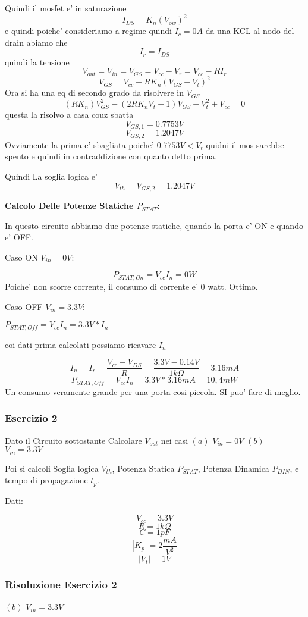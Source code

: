 \documentclass[\main/main.tex]{subfiles}
\begin{document}
Quindi il mosfet e' in saturazione
\[I_{DS} = K_n \left(V_{ow}\right)^2 \]
e quindi poiche' consideriamo a regime quindi $I_c = 0A$
da una KCL al nodo del drain abiamo che
\[I_r = I_{DS} \]
quindi la tensione
\[V_{out} = V_{in} = V_{GS} = V_{cc} - V_r = V_{cc} - R I_r\]
\[V_{GS} = V_{cc} - R K_n \left(V_{GS} - V_t \right)^2\]
Ora si ha una eq di secondo grado da risolvere in $V_{GS}$
\[(R K_n)V_{GS}^2 - (2 R K_n V_t + 1)V_{GS} + V_t^2 + V_{cc} = 0\]
questa la risolvo a casa couz sbatta
\[V_{GS,1} = 0.7753V\]
\[V_{GS,2} = 1.2047V\]
Ovviamente la prima e' sbagliata poiche' $0.7753V < V_t$ quidni il mos sarebbe spento e quindi in contraddizione con quanto detto prima.

Quindi La soglia logica e' \[V_{th} = V_{GS,2} = 1.2047V\]

\textbf{Calcolo Delle Potenze Statiche $P_{STAT}$:}

In questo circuito abbiamo due potenze statiche, quando la porta e' ON e quando e' OFF.

Caso ON $V_{in} = 0V$:

\[P_{STAT,On} = V_{cc} I_{n} = 0W\]
Poiche' non scorre corrente, il consumo di corrente e' 0 watt. Ottimo.


Caso OFF $V_{in} = 3.3V$:

$P_{STAT,Off} = V_{cc} I_{n} = 3.3V * I_{n}$

coi dati prima calcolati possiamo ricavare $I_{n}$

\[I_{n} = I_{r} = \frac{V_{cc} - V_{DS}}{R} = \frac{3.3V - 0.14V}{1k\Omega} = 3.16mA\]
\[P_{STAT,Off} = V_{cc} I_{n} = 3.3V * 3.16mA = 10,4mW\]
Un consumo veramente grande per una porta cosi piccola. SI puo' fare di meglio.

\clearpage
\subsubsection{Esercizio 2}
Dato il Circuito sottostante Calcolare $V_{out}$ nei casi 
$(a)$ $V_{in} = 0V$
$(b)$ $V_{in} = 3.3V$

Poi si calcoli Soglia logica $V_{th}$, Potenza Statica $P_{STAT}$, Potenza Dinamica $P_{DIN}$, e tempo di propagazione $t_p$.



Dati:

\[V_{cc} = 3.3V\]
\[R = 1k\Omega\]
\[C = 1pF\]
\[|K_p| = 2 \frac{mA}{V^2}\]
\[|V_t| = 1V\]

\clearpage
\subsubsection{Risoluzione Esercizio 2}
$(b)$ $V_{in} = 3.3V$
\end{document}
